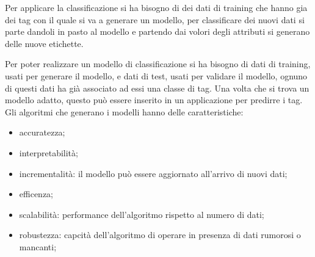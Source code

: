 \documentclass[12pt]{article}
\begin{document}
Per applicare la classificazione si ha bisogno di dei dati di training che hanno gia dei tag con il quale si va a generare un modello, per classificare dei nuovi dati si parte dandoli in pasto al modello e partendo dai volori degli attributi si generano delle nuove etichette.

Per poter realizzare un modello di classificazione si ha bisogno di dati di training, usati per generare il modello, e dati di test, usati per validare il modello, ognuno di questi dati ha gi\`a associato ad essi una classe di tag. Una volta che si trova un modello adatto, questo pu\`o essere inserito in un applicazione per predirre i tag. Gli algoritmi che generano i modelli hanno delle caratteristiche:
\begin{itemize}
    \item accuratezza;
    \item interpretabilit\`a;
    \item incrementalit\`a: il modello pu\`o essere aggiornato all'arrivo di nuovi dati;
    \item efficenza;
    \item scalabilit\`a: performance dell'algoritmo rispetto al numero di dati;
    \item robustezza: capcit\`a dell'algoritmo di operare in presenza di dati rumorosi o mancanti;
\end{itemize}
\end{document}
